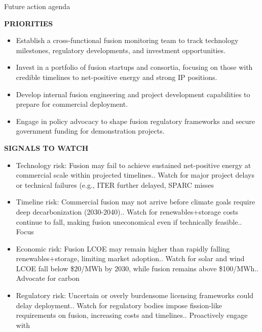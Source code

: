 \documentclass[10pt,a4paper]{article}
\begin{document}
\clearpage
{\sffamily\fontsize{21}{26}\selectfont\color{BONavy} Future action agenda}\par\vspace{7pt}
\begin{minipage}[t]{0.47\linewidth}
{\textcolor{BOGreen}{\scriptsize\bfseries PRIORITIES}}\par\vspace{3pt}
{\small\begin{itemize}
\item Establish a cross-functional fusion monitoring team to track technology milestones, regulatory developments, and investment opportunities.
\item Invest in a portfolio of fusion startups and consortia, focusing on those with credible timelines to net-positive energy and strong IP positions.
\item Develop internal fusion engineering and project development capabilities to prepare for commercial deployment.
\item Engage in policy advocacy to shape fusion regulatory frameworks and secure government funding for demonstration projects.
\end{itemize}}
\end{minipage}\hfill\begin{minipage}[t]{0.45\linewidth}
{\textcolor{BOGreen}{\scriptsize\bfseries SIGNALS TO WATCH}}\par\vspace{3pt}
{\small\begin{itemize}
\item Technology risk: Fusion may fail to achieve sustained net-positive energy at commercial scale within projected timelines.. Watch for major project delays or technical failures (e.g., ITER further delayed, SPARC misses
\item Timeline risk: Commercial fusion may not arrive before climate goals require deep decarbonization (2030-2040).. Watch for renewables+storage costs continue to fall, making fusion uneconomical even if technically feasible.. Focus
\item Economic risk: Fusion LCOE may remain higher than rapidly falling renewables+storage, limiting market adoption.. Watch for solar and wind LCOE fall below \$20/MWh by 2030, while fusion remains above \$100/MWh.. Advocate for carbon
\item Regulatory risk: Uncertain or overly burdensome licensing frameworks could delay deployment.. Watch for regulatory bodies impose fission-like requirements on fusion, increasing costs and timelines.. Proactively engage with
\end{itemize}}
\end{minipage}
\end{document}
